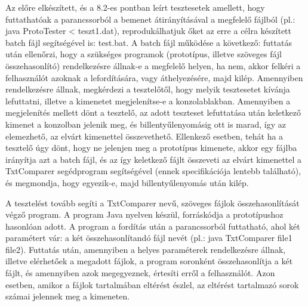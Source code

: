 Az előre elkészített, és a 8.2-es pontban leírt tesztesetek amellett, hogy futtathatóak a parancssorból a bemenet átirányításával a megfelelő fájlból (pl.: java ProtoTester < teszt1.dat), reprodukálhatjuk őket az erre a célra készített batch fájl segítségével is: test.bat.
A batch fájl működése a következő: futtatás után ellenőrzi, hogy a szükséges programok (prototípus, illetve szöveges fájl összehasonlító) rendelkezésre állnak-e a megfelelő helyen, ha nem, akkor felkéri a felhasználót azoknak a lefordítására, vagy áthelyezésére, majd kilép. Amennyiben rendelkezésre állnak, megkérdezi a tesztelőtől, hogy melyik tesztesetet kívánja lefuttatni, illetve a kimenetet megjelenítse-e a konzolablakban. Amennyiben a megjelenítés mellett dönt a tesztelő, az adott teszteset lefuttatása után keletkező kimenet a konzolban jelenik meg, és billentyűlenyomásig ott is marad, így az elemezhető, az elvárt kimenettel összevethető. Ellenkező esetben, tehát ha a tesztelő úgy dönt, hogy ne jelenjen meg a prototípus kimenete, akkor egy fájlba irányítja azt a batch fájl, és az így keletkező fájlt összeveti az elvárt kimenettel a TxtComparer segédprogram segítségével (ennek specifikációja lentebb található), és megmondja, hogy egyezik-e, majd billentyűlenyomás után kilép.

A tesztelést tovább segíti a TxtComparer nevű, szöveges fájlok összehasonlítását végző program. A program Java nyelven készül, forráskódja a prototípushoz hasonlóan adott. A program a fordítás után a parancssorból futtatható, ahol két paramétert vár: a két összehasonlítandó fájl nevét (pl.: java TxtComparer file1 file2). 
Futtatás után, amennyiben a helyes paraméterek rendelkezésre állnak, illetve elérhetőek a megadott fájlok, a program soronként összehasonlítja a két fájlt, és amennyiben azok megegyeznek, értesíti erről a felhasználót. Azon esetben, amikor a fájlok tartalmában eltérést észlel, az eltérést tartalmazó sorok számai jelennek meg a kimeneten.
